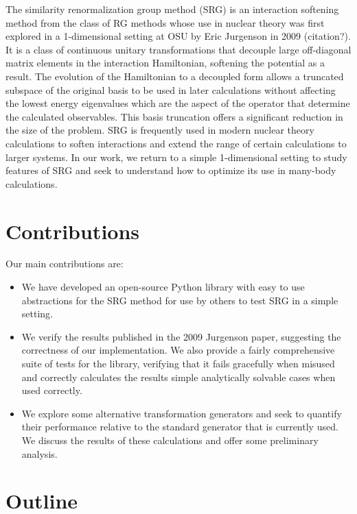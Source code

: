 The similarity renormalization group method (SRG) is an interaction softening method from the class of RG methods whose use in nuclear theory was first explored in a 1-dimensional setting at OSU by Eric Jurgenson in 2009 (citation?). It is a class of continuous unitary transformations that decouple large off-diagonal matrix elements in the interaction Hamiltonian, softening the potential as a result. The evolution of the Hamiltonian to a decoupled form allows a truncated subspace of the original basis to be used in later calculations without affecting the lowest energy eigenvalues which are the aspect of the operator that determine the calculated observables. This basis truncation offers a significant reduction in the size of the problem. SRG is frequently used in modern nuclear theory calculations to soften interactions and extend the range of certain calculations to larger systems. In our work, we return to a simple 1-dimensional setting to study features of SRG and seek to understand how to optimize its use in many-body calculations.

\section{Contributions}

Our main contributions are:
\begin{itemize}
    \item{We have developed an open-source Python library with easy to use abstractions for the SRG method for use by others to test SRG in a simple setting.}
    \item{We verify the results published in the 2009 Jurgenson paper, suggesting the correctness of our implementation. We also provide a fairly comprehensive suite of tests for the library, verifying that it fails gracefully when misused and correctly calculates the results simple analytically solvable cases when used correctly.}
    \item{We explore some alternative transformation generators and seek to quantify their performance relative to the standard generator that is currently used. We discuss the results of these calculations and offer some preliminary analysis.}
\end{itemize}

\section{Outline}

